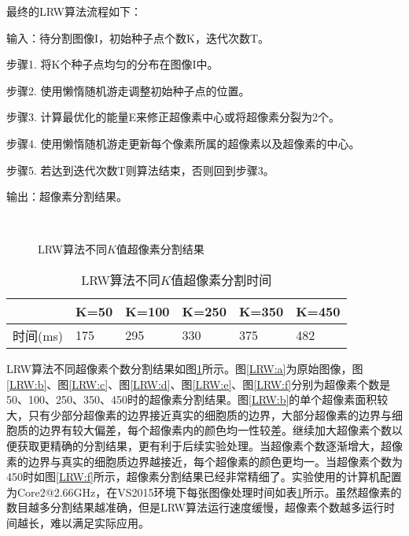 \documentclass[nomlist,masters]{seuthesix}
\begin{document}
最终的LRW算法流程如下：

输入：待分割图像I，初始种子点个数K，迭代次数T。

步骤1. 将K个种子点均匀的分布在图像I中。

步骤2. 使用懒惰随机游走调整初始种子点的位置。

步骤3. 计算最优化的能量E来修正超像素中心或将超像素分裂为2个。

步骤4. 使用懒惰随机游走更新每个像素所属的超像素以及超像素的中心。

步骤5. 若达到迭代次数T则算法结束，否则回到步骤3。

输出：超像素分割结果。



\begin{figure}[H]
\centering 
\hspace{0.01\textwidth}
\hspace{0.01\textwidth}
\vfill
\centering 
\hspace{0.01\textwidth} 
\hspace{0.01\textwidth}
\caption{LRW算法不同$K$值超像素分割结果}
\label{LRW}
\end{figure}

\begin{table}[H]
\centering
\caption{LRW算法不同$K$值超像素分割时间\label{LRWtime}}
\begin{tabular}{|p{2cm}<{\centering}|p{2cm}<{\centering}|p{2cm}<{\centering}|p{2cm}<{\centering}|p{2cm}<{\centering}|p{2cm}<{\centering}|}
\hline
 & K=50 & K=100 & K=250 & K=350 & K=450\\
\hline
时间(ms) & 175 & 295 & 330 & 375 & 482\\
\hline
\end{tabular}
\end{table}

LRW算法不同超像素个数分割结果如图\ref{LRW}所示。图\ref{LRW:a}为原始图像，图\ref{LRW:b}、图\ref{LRW:c}、图\ref{LRW:d}、图\ref{LRW:e}、图\ref{LRW:f}分别为超像素个数是50、100、250、350、450时的超像素分割结果。图\ref{LRW:b}的单个超像素面积较大，只有少部分超像素的边界接近真实的细胞质的边界，大部分超像素的边界与细胞质的边界有较大偏差，每个超像素内的颜色均一性较差。继续加大超像素个数以便获取更精确的分割结果，更有利于后续实验处理。当超像素个数逐渐增大，超像素的边界与真实的细胞质边界越接近，每个超像素的颜色更均一。当超像素个数为450时如图\ref{LRW:f}所示，超像素分割结果已经非常精细了。实验使用的计算机配置为Core2@2.66GHz，在VS2015环境下每张图像处理时间如表\ref{LRWtime}所示。虽然超像素的数目越多分割结果越准确，但是LRW算法运行速度缓慢，超像素个数越多运行时间越长，难以满足实际应用。
\end{document}
